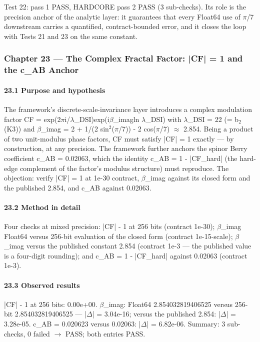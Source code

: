 \documentclass[10pt]{article}
\begin{document}
Test 22: pass 1 PASS, HARDCORE pass 2 PASS (3 sub-checks). Its role is the precision anchor of the analytic layer: it guarantees that every Float64 use of $\pi$/7 downstream carries a quantified, contract-bounded error, and it closes the loop with Tests 21 and 23 on the same constant.

\subsubsection{Chapter 23 --- The Complex Fractal Factor: |CF| = 1 and the c\_AB Anchor}

\paragraph{23.1 Purpose and hypothesis}

The framework's discrete-scale-invariance layer introduces a complex modulation factor CF = exp(2$\pi$i/$\lambda$\_DSI)\textperiodcentered{}exp(i\textperiodcentered{}$\beta$\_imag\textperiodcentered{}ln $\lambda$\_DSI) with $\lambda$\_DSI = 22 (= b$_2$(K3)) and $\beta$\_imag = 2 + 1/(2 sin$^2$($\pi$/7)) - 2 cos($\pi$/7) $\approx$ 2.854. Being a product of two unit-modulus phase factors, CF must satisfy |CF| = 1 exactly --- by construction, at any precision. The framework further anchors the spinor Berry coefficient c\_AB = 0.02063, which the identity c\_AB = 1 - |CF\_hard| (the hard-edge complement of the factor's modulus structure) must reproduce. The objection: verify |CF| = 1 at 1e-30 contract, $\beta$\_imag against its closed form and the published 2.854, and c\_AB against 0.02063.

\paragraph{23.2 Method in detail}

Four checks at mixed precision: |CF| - 1 at 256 bits (contract 1e-30); $\beta$\_imag Float64 versus 256-bit evaluation of the closed form (contract 1e-15-scale); $\beta$\_imag versus the published constant 2.854 (contract 1e-3 --- the published value is a four-digit rounding); and c\_AB = 1 - |CF\_hard| against 0.02063 (contract 1e-3).

\paragraph{23.3 Observed results}

|CF| - 1 at 256 bits: 0.00e+00. $\beta$\_imag: Float64 2.854032819406525 versus 256-bit 2.854032819406525 --- |$\Delta$| = 3.04e-16; versus the published 2.854: |$\Delta$| = 3.28e-05. c\_AB = 0.020623 versus 0.02063: |$\Delta$| = 6.82e-06. Summary: 3 sub-checks, 0 failed $\rightarrow$ PASS; both entries PASS.
\end{document}
